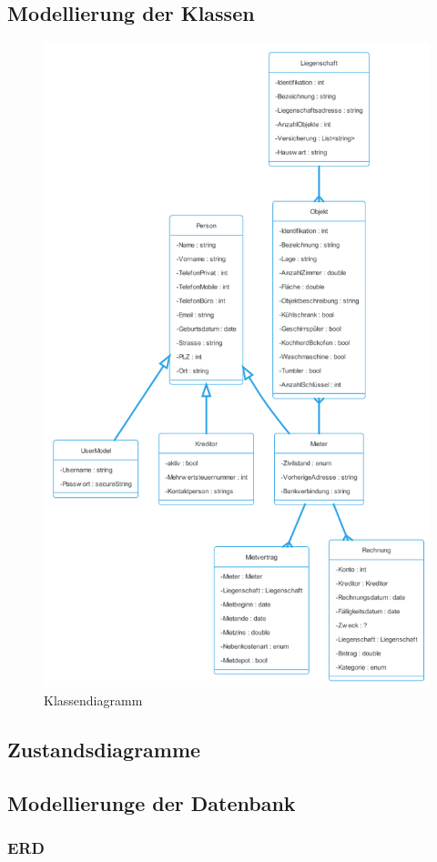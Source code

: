 \subsection{Modellierung der Klassen}
\begin{figure}[H]
  \begin{center}
    \includegraphics[width=0.75\linewidth]{content/diagrams/out/classdiagramm/ImmoGlobal.png}
    \caption{Klassendiagramm}
  \end{center}
\end{figure}

\subsection{Zustandsdiagramme}
\subsection{Modellierunge der Datenbank}
\subsubsection{ERD}
